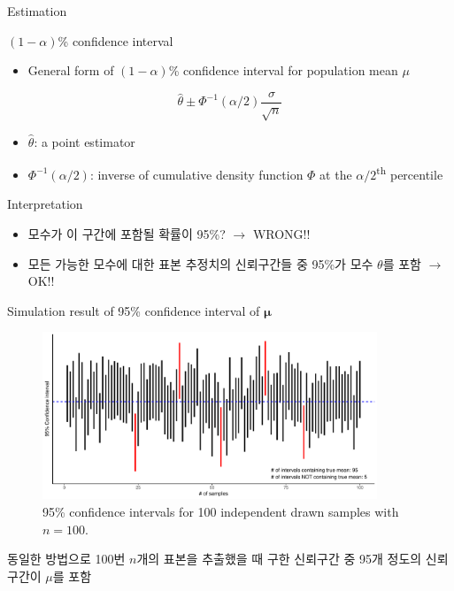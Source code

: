 \documentclass[9pt,ignorenonframetext,xcolor=dvipsnames]{beamer}
\providecommand{\tightlist}{%
  \setlength{\itemsep}{0pt}\setlength{\parskip}{0pt}}
\newlength{\wideitemsep}
\let\olditem\item
\renewcommand{\item}{\setlength{\itemsep}{\wideitemsep}\olditem}
\begin{document}
\begin{frame}{Estimation}

\begin{block}{\((1-\alpha)\)\% confidence interval}

\begin{itemize}
\tightlist
\item
  General form of \((1-\alpha)\)\% confidence interval for population
  mean \(\mu\)
\end{itemize}

\[
  \hat{\theta} \pm \Phi^{-1}(\alpha /2)\frac{\sigma}{\sqrt{n}}
\]

\begin{itemize}
\tightlist
\item
  \(\hat{\theta}\): a point estimator
\item
  \(\Phi^{-1}(\alpha /2)\): inverse of cumulative density function
  \(\Phi\) at the \(\alpha /2\)\textsuperscript{th} percentile
\end{itemize}

\end{block}

\begin{block}{Interpretation}

\begin{itemize}
\tightlist
\item
  모수가 이 구간에 포함될 확률이 95\%? \(\rightarrow\) WRONG!!
\item
  모든 가능한 모수에 대한 표본 추정치의 신뢰구간들 중 95\%가 모수
  \(\theta\)를 포함 \(\rightarrow\) OK!!
\end{itemize}

\end{block}

\end{frame}

\begin{frame}{Simulation result of 95\% confidence interval of
\(\mathbf{\mu}\)}

\begin{figure}[H]

{\centering \includegraphics[width=10cm,height=5cm]{Figures/sim-95CI-1} 

}

\caption{95\% confidence intervals for 100 independent drawn samples with $n = 100$.}\label{fig:sim-95CI}
\end{figure}

\begin{mdframed}[backgroundcolor = gray!30]
동일한 방법으로 100번 $n$개의 표본을 추출했을 때 구한 신뢰구간 중 95개 정도의 신뢰구간이 $\mu$를 포함
\end{mdframed}

\end{frame}
\end{document}
